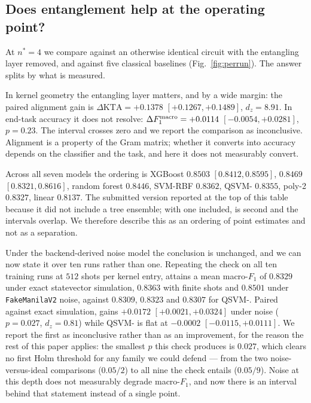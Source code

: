 \subsection{Does entanglement help at the operating point?}
\label{sec:res-c2}


\begin{revbody}


At $n^\ast=4$ we compare \QSVM{} against an otherwise identical circuit with the
entangling layer removed, and against five classical baselines
(Fig.~\ref{fig:perrun}). The answer splits by what is measured.

In kernel geometry the entangling layer matters, and by a wide margin: the
paired alignment gain is $\Delta\mathrm{KTA} = +0.1378$
$[+0.1267,+0.1489]$, $d_z=8.91$. In end-task accuracy it does not resolve:
$\Delta F_1^{\mathrm{macro}} = +0.0114$ $[-0.0054,+0.0281]$, $p=0.23$. The interval crosses zero
and we report the comparison as inconclusive. Alignment is a property of the
Gram matrix; whether it converts into accuracy depends on the classifier and the
task, and here it does not measurably convert.

Across all seven models the ordering is
XGBoost $0.8503$ $[0.8412,0.8595]$, \QSVM{} $0.8469$ $[0.8321,0.8616]$, random
forest $0.8446$, SVM-RBF $0.8362$, QSVM-\Zmap{} $0.8355$, poly-2 $0.8327$,
linear $0.8137$. The submitted version reported \QSVM{} at the top of this table
because it did not include a tree ensemble; with one included, \QSVM{} is second
and the intervals overlap. We therefore describe this as an ordering of point
estimates and not as a separation.

Under the backend-derived noise model the conclusion is unchanged, and we can
now state it over ten runs rather than one. Repeating the check on all ten
training runs at $512$ shots per kernel entry, \QSVM{} attains a mean
macro-$F_1$ of $0.8329$ under exact statevector simulation, $0.8363$ with
finite shots and $0.8501$ under \texttt{FakeManilaV2} noise, against
$0.8309$, $0.8323$ and $0.8307$ for QSVM-\Zmap{}. Paired against exact
simulation, \QSVM{} gains $+0.0172$ $[+0.0021,+0.0324]$ under noise
($p=0.027$, $d_z=0.81$) while QSVM-\Zmap{} is flat at
$-0.0002$ $[-0.0115,+0.0111]$. We report the first as inconclusive rather
than as an improvement, for the reason the rest of this paper applies: the
smallest $p$
this check produces is $0.027$, which clears no first Holm threshold for any
family we could defend --- from the two noise-versus-ideal comparisons
($0.05/2$) to all nine the check entails ($0.05/9$). Noise at this depth
does not measurably degrade macro-$F_1$, and now there is an interval behind
that statement instead of a single point.


\end{revbody}
